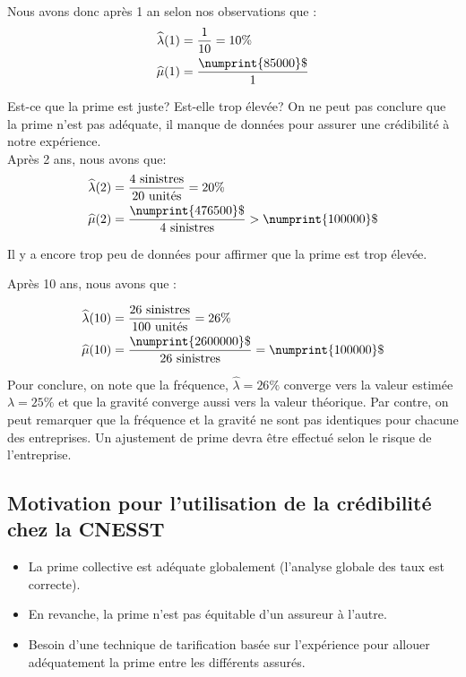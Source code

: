 Nous avons donc après 1 an selon nos observations que :
\begin{align*}
\widehat{\lambda}(1) &= \frac{1}{10} = 10 \% \\
\widehat{\mu}(1) &= \frac{\numprint{85000}\$}{1}
\end{align*}

Est-ce que la prime est juste? Est-elle trop élevée?
On ne peut pas conclure que la prime n'est pas adéquate, il manque de données pour assurer une crédibilité à notre expérience.
\\

Après 2 ans, nous avons que:
\begin{align*}
\widehat{\lambda}(2) &= \frac{4 \text{ sinistres}}{20 \text{ unités}} = 20\% \\
\widehat{\mu}(2) &= \frac{\numprint{476500}\$}{4 \text{ sinistres}} > \numprint{100000}\$
\end{align*}

Il y a encore trop peu de données pour affirmer que la prime est trop élevée.

Après 10 ans, nous avons que :

\begin{align*}
\widehat{\lambda}(10) &= \frac{26 \text{ sinistres}}{100 \text{ unités}} = 26 \% \\
\widehat{\mu}(10) &= \frac{\numprint{2600000}\$}{26\text{ sinistres}} = \numprint{100000}\$
\end{align*}

Pour conclure, on note que la fréquence, $\widehat{\lambda} = 26\% $ converge vers la valeur estimée $\lambda = 25 \%$ et que la gravité converge aussi vers la valeur théorique.
Par contre, on peut remarquer que la fréquence et la gravité ne sont pas identiques pour chacune des entreprises. Un ajustement de prime devra être effectué selon le risque de l'entreprise.
\\
\subsection*{Motivation pour l'utilisation de la crédibilité chez la CNESST}
\begin{itemize}
\item La prime collective est adéquate globalement (l'analyse globale des taux est correcte).
\item En revanche, la prime n'est pas équitable d'un assureur à l'autre.
\item Besoin d'une technique de tarification basée sur l'expérience pour allouer adéquatement la prime entre les différents assurés.
\end{itemize}
\bigskip

